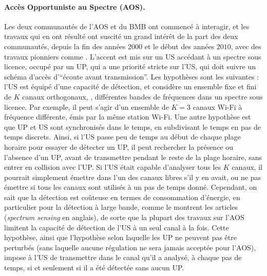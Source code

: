 \begin{resume_fr}
\paragraph{Accès Opportuniste au Spectre (AOS).}
%
Les deux communautés de l'AOS et du BMB ont commencé à interagir, et les travaux qui en ont résulté ont suscité un grand intérêt de la part des deux communautés, depuis la fin des années $2000$ et le début des années $2010$, avec des travaux pionniers comme \cite{Liu08,Zhao10,Jouini09,Jouini10}.
L'accent est mis sur un US accédant à un spectre sous licence, occupé par un UP, qui a une priorité stricte sur l'US, qui doit suivre un schéma d'accès d'``écoute avant transmission''.
%
Les hypothèses sont les suivantes :
l'US est équipé d'une capacité de détection,
et considère un ensemble fixe et fini de $K$ canaux orthogonaux, \ie, différentes bandes de fréquences dans un spectre sous licence.
Par exemple, il peut s'agir d'un ensemble de $K=3$ canaux Wi-Fi à fréquence différente, émis par la même station Wi-Fi.
Une autre hypothèse est que UP et US sont synchronisés dans le temps, en subdivisant le temps en pas de temps discrets.
%
Ainsi, si l'US passe peu de temps au début de chaque plage horaire pour essayer de détecter un UP, il peut rechercher la présence ou l'absence d'un UP, avant de transmettre pendant le reste de la plage horaire, sans entrer en collision avec l'UP.
Si l'US était capable d'analyser tous les $K$ canaux, il pourrait simplement émettre dans l'un des canaux libres s'il y en avait, ou ne pas émettre si tous les canaux sont utilisés à un pas de temps donné.
%
Cependant, on sait que la détection est coûteuse en termes de consommation d'énergie, en particulier pour la détection à large bande, comme le montrent les articles \cite{yucek2009survey,subhedar2011spectrum} (\emph{spectrum sensing} en anglais), de sorte que la plupart des travaux sur l'AOS limitent la capacité de détection de l'US à un seul canal à la fois.
Cette hypothèse, ainsi que l'hypothèse selon laquelle les UP ne peuvent pas être perturbés (sans laquelle aucune régulation ne sera jamais acceptée pour l'AOS), impose à l'US de transmettre dans le canal qu'il a analysé, à chaque pas de temps, si et seulement si il a été détectée sans aucun UP.


\end{resume_fr}
